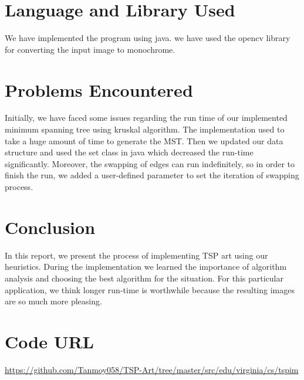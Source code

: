 \documentclass[a4paper,12pt]{article}
\begin{document}
\section{Language and Library Used}
We have implemented the program using java.  we have used the opencv library for converting  the input image to monochrome. 

\section{Problems Encountered}
Initially, we have faced some issues regarding the run time of our implemented minimum spanning tree using kruskal algorithm. The implementation used to take a huge amount of time to generate the MST. Then we updated our data structure and used the set class in java which decreased the run-time significantly. Moreover, the swapping of edges can run indefinitely, so in order to finish the run, we added a user-defined parameter to set the iteration of swapping process. 

\medskip
\section{Conclusion} 
In this report, we present the process of implementing TSP art using our heuristics. During the implementation we learned the importance of algorithm analysis and choosing the best algorithm for the situation.  For this particular application, we think longer run-time is worthwhile because the resulting images are so much more pleasing. 

\medskip
\section{Code URL}

\url{https://github.com/Tanmoy058/TSP-Art/tree/master/src/edu/virginia/cs/tspim}

%
\end{document}
